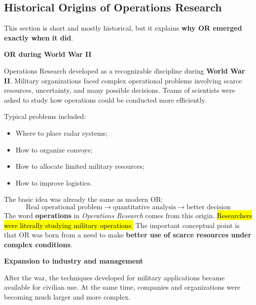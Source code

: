 \subsection{Historical Origins of Operations Research}\label{sec:introduction:historical-origins-of-operations-research}

This section is short and mostly historical, but it explains \textbf{why OR emerged exactly when it did}.

\highspace
\begin{flushleft}
    \textcolor{Green3}{ \textbf{OR during World War II}}
\end{flushleft}
Operations Research developed as a recognizable discipline during \textbf{World War II}. Military organizations faced complex operational problems involving scarce resources, uncertainty, and many possible decisions. Teams of scientists were asked to study how operations could be conducted more efficiently.

\highspace
Typical problems included:
\begin{itemize}
    \item Where to place radar systems;
    \item How to organize convoys;
    \item How to allocate limited military resources;
    \item How to improve logistics.
\end{itemize}
The basic idea was already the same as modern OR:
\begin{equation*}
    \text{Real operational problem}
    \rightarrow
    \text{quantitative analysis}
    \rightarrow
    \text{better decision}
\end{equation*}
The word \textbf{operations} in \emph{Operations Research} comes from this origin. \hl{Researchers were literally studying military operations.} The important conceptual point is that OR was born from a need to make \textbf{better use of scarce resources under complex conditions}.

\highspace
\begin{flushleft}
    \textcolor{Green3}{ \textbf{Expansion to industry and management}}
\end{flushleft}
After the war, the techniques developed for military applications became available for civilian use. At the same time, companies and organizations were becoming much larger and more complex.

